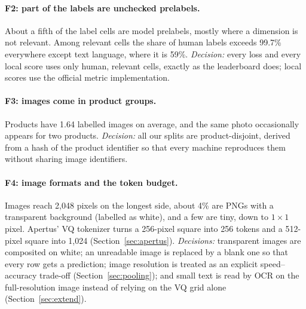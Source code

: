 \documentclass[11pt]{article}
\begin{document}
\begin{table}[ht]
\centering
\caption{The rarest classes (human, relevant cells). A larger holdout adds few rare examples to evaluation and takes them from training.}
\label{tab:rare}
\end{table}

\paragraph{F2: part of the labels are unchecked prelabels.} About a fifth of the label cells are model prelabels, mostly where a dimension is not relevant. Among relevant cells the share of human labels exceeds 99.7\% everywhere except text language, where it is 59\%. \emph{Decision:} every loss and every local score uses only human, relevant cells, exactly as the leaderboard does; local scores use the official metric implementation.

\paragraph{F3: images come in product groups.} Products have 1.64 labelled images on average, and the same photo occasionally appears for two products. \emph{Decision:} all our splits are product-disjoint, derived from a hash of the product identifier so that every machine reproduces them without sharing image identifiers.

\paragraph{F4: image formats and the token budget.} Images reach 2,048 pixels on the longest side, about 4\% are PNGs with a transparent background (labelled as white), and a few are tiny, down to $1\times1$ pixel. Apertus' VQ tokenizer turns a 256-pixel square into 256 tokens and a 512-pixel square into 1,024 (Section~\ref{sec:apertus}). \emph{Decisions:} transparent images are composited on white; an unreadable image is replaced by a blank one so that every row gets a prediction; image resolution is treated as an explicit speed--accuracy trade-off (Section~\ref{sec:pooling}); and small text is read by OCR on the full-resolution image instead of relying on the VQ grid alone (Section~\ref{sec:extend}).
\end{document}
